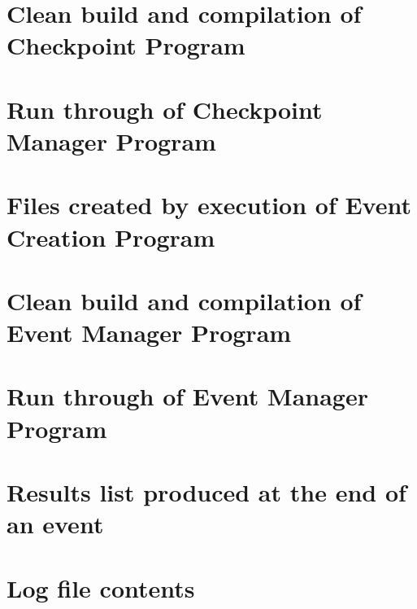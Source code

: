 \documentclass[a4paper,12pt]{article}
\begin{document}
\section{Clean build and compilation of Checkpoint Program}


\section{Run through of Checkpoint Manager Program}

\section{Files created by execution of Event Creation Program}

\section{Clean build and compilation of Event Manager Program}

\section{Run through of Event Manager Program}

\section{Results list produced at the end of an event}

\section{Log file contents}
\end{document}
